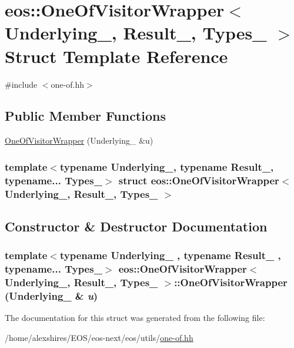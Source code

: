 \hypertarget{structeos_1_1OneOfVisitorWrapper}{
\section{eos::OneOfVisitorWrapper$<$ Underlying\_\-, Result\_\-, Types\_\- $>$ Struct Template Reference}
\label{structeos_1_1OneOfVisitorWrapper}
}


{\ttfamily \#include $<$one-\/of.hh$>$}\subsection*{Public Member Functions}
\begin{DoxyCompactItemize}
\item 
\hyperlink{structeos_1_1OneOfVisitorWrapper_a06360b538cff00799456139edb5f5e21}{OneOfVisitorWrapper} (Underlying\_\- \&u)
\end{DoxyCompactItemize}
\subsubsection*{template$<$typename Underlying\_\-, typename Result\_\-, typename... Types\_\-$>$ struct eos::OneOfVisitorWrapper$<$ Underlying\_\-, Result\_\-, Types\_\- $>$}



\subsection{Constructor \& Destructor Documentation}
\hypertarget{structeos_1_1OneOfVisitorWrapper_a06360b538cff00799456139edb5f5e21}{
\subsubsection[{OneOfVisitorWrapper}]{\setlength{\rightskip}{0pt plus 5cm}template$<$typename Underlying\_\- , typename Result\_\- , typename... Types\_\-$>$ {\bf eos::OneOfVisitorWrapper}$<$ Underlying\_\-, Result\_\-, Types\_\- $>$::{\bf OneOfVisitorWrapper} (Underlying\_\- \& {\em u})}}
\label{structeos_1_1OneOfVisitorWrapper_a06360b538cff00799456139edb5f5e21}


The documentation for this struct was generated from the following file:\begin{DoxyCompactItemize}
\item 
/home/alexshires/EOS/eos-\/next/eos/utils/\hyperlink{one-of_8hh}{one-\/of.hh}\end{DoxyCompactItemize}
